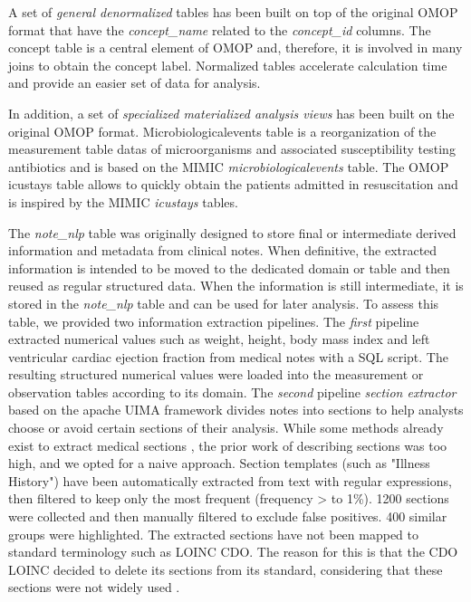 A set of \emph{general denormalized} tables has been built on top of the original 
OMOP  format that have the \textit{concept\_name} related to the \textit{concept\_id} 
columns. The concept table is a central element of OMOP and, therefore, it is 
involved in many joins to obtain the concept label. Normalized tables accelerate 
calculation time and provide an easier set of data for analysis.

In addition, a set of \emph{specialized materialized analysis views} has been built 
on the original OMOP format. Microbiologicalevents table is a reorganization of the 
measurement table datas of microorganisms and associated susceptibility testing 
antibiotics and is based on the MIMIC \textit{microbiologicalevents} table. 
The OMOP icustays table allows to quickly obtain the patients admitted in 
resuscitation and is inspired by the MIMIC \textit{icustays} tables.

The \textit{note\_nlp} table was originally designed to store final or intermediate 
derived information and metadata from clinical notes. When definitive, the 
extracted information is intended to be moved to the dedicated domain or table 
and then reused as regular structured data. 
When the information is still intermediate, it is stored in the \textit{note\_nlp} 
table and can be used for later analysis. 
To assess this table, we provided two information extraction pipelines. 
The \emph{first} pipeline extracted numerical values such as weight, height, 
body mass index and left ventricular cardiac ejection fraction from medical notes 
with a SQL script. The resulting structured numerical values were loaded into the 
measurement or observation tables according to its domain. 
The \emph{second} pipeline \emph{section extractor} based on the apache UIMA 
framework divides notes into sections to help analysts choose or avoid certain 
sections of their analysis. While some methods already exist to extract 
medical sections \cite{section-extraction}, the prior work of describing sections 
was too high, and we opted for a naive approach. Section templates (such as 
"Illness History") have been automatically extracted from text with regular 
expressions, then filtered to keep only the most frequent (frequency > to 1\%). 
1200 sections were collected and then manually filtered to exclude false positives. 
400 similar groups were highlighted. The extracted sections have not been mapped 
to standard terminology such as LOINC CDO. The reason for this is that the CDO 
LOINC decided to delete its sections from its standard, considering that these 
sections were not widely used  \cite{loinc-website}.


